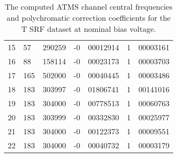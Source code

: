 \begin{table}[htp]
\begin{tabular}{C{1.5cm} R{1.0cm}@{.}L{1.5cm} *{2}{R{1cm}@{.}L{2cm}}}
    15 &  57&290259 & -0&00012914 & 1&00003161 \\
    16 &  88&158114 & -0&00023173 & 1&00003703 \\
    17 & 165&502000 & -0&00040445 & 1&00003486 \\
    18 & 183&303997 & -0&01806741 & 1&00141016 \\
    19 & 183&304000 & -0&00778513 & 1&00060763 \\
    20 & 183&303999 & -0&00332830 & 1&00025977 \\
    21 & 183&304000 & -0&00122373 & 1&00009551 \\
    22 & 183&304000 & -0&00040732 & 1&00003179 \\
    \hline
  \end{tabular}
  \caption{The computed ATMS channel central frequencies and polychromatic correction coefficients for the T SRF dataset at nominal bias voltage.}
  \label{tab:atms_Tnominal_results}
\end{table}

